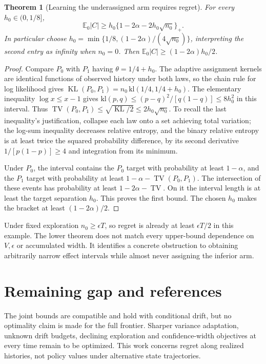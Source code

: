 \documentclass[11pt]{article}
\newtheorem{theorem}{Theorem}
\theoremstyle{remark}\newtheorem{remark}[theorem]{Remark}
\newcommand{\E}{\mathbb E}
\newcommand{\KL}{\operatorname{KL}}
\newcommand{\TV}{\operatorname{TV}}
\begin{document}
\begin{theorem}[Learning the underassigned arm requires regret]
For every $h_0\in(0,1/8]$,
\[
 \E_0|C|\ge h_0\{1-2\alpha-2h_0\sqrt{n_0}\}_+.
\]
In particular choose
$h_0=\min\{1/8,(1-2\alpha)/(4\sqrt{n_0})\}$, interpreting the second entry as infinity when $n_0=0$. Then
$\E_0|C|\ge(1-2\alpha)h_0/2$.
\end{theorem}
\begin{proof}
Compare $P_0$ with $P_1$ having $\theta=1/4+h_0$. The adaptive assignment kernels are identical functions of observed history under both laws, so the chain rule for log likelihood gives
$\KL(P_0,P_1)=n_0\,\mathrm{kl}(1/4,1/4+h_0)$.
The elementary inequality $\log x\le x-1$ gives
$\mathrm{kl}(p,q)\le(p-q)^2/[q(1-q)]\le8h_0^2$ in this interval. Thus $\TV(P_0,P_1)\le\sqrt{\KL/2}\le2h_0\sqrt{n_0}$. To recall the last inequality's justification, collapse each law onto a set achieving total variation; the log-sum inequality decreases relative entropy, and the binary relative entropy is at least twice the squared probability difference, by its second derivative $1/[p(1-p)]\ge4$ and integration from its minimum.

Under $P_0$, the interval contains the $P_0$ target with probability at least $1-\alpha$, and the $P_1$ target with probability at least $1-\alpha-\TV(P_0,P_1)$. The intersection of these events has probability at least $1-2\alpha-\TV$. On it the interval length is at least the target separation $h_0$. This proves the first bound. The chosen $h_0$ makes the bracket at least $(1-2\alpha)/2$.
\end{proof}

Under fixed exploration $n_0\ge\epsilon T$, so regret is already at least $\epsilon T/2$ in this example. The lower theorem does not match every upper-bound dependence on $V,\epsilon$ or accumulated width. It identifies a concrete obstruction to obtaining arbitrarily narrow effect intervals while almost never assigning the inferior arm.

\section*{Remaining gap and references}
The joint bounds are compatible and hold with conditional drift, but no optimality claim is made for the full frontier. Sharper variance adaptation, unknown drift budgets, declining exploration and confidence-width objectives at every time remain to be optimized. This work concerns regret along realized histories, not policy values under alternative state trajectories.
\end{document}

